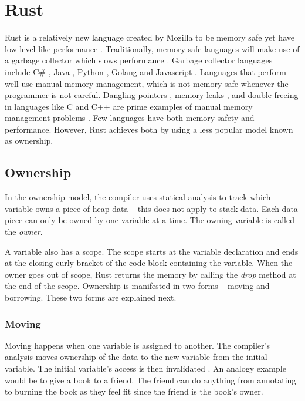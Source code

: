\section{Rust}
Rust is a relatively new language created by Mozilla to be memory safe yet have low level like performance \cite{klabnik_2019_01}.
Traditionally, memory safe languages will make use of a garbage collector which slows performance \cite{hertz_05_01}.
Garbage collector languages include C\# \cite{robinson_04_01}, Java \cite{gosling_96_01}, Python \cite{martelli_06_01}, Golang \cite{tsoukalos_18_01} and Javascript \cite{flanagan_06_01}.
Languages that perform well use manual memory management, which is not memory safe whenever the programmer is not careful.
Dangling pointers \cite{caballero_12_01}, memory leaks \cite{wilson_92_01}, and double freeing \cite{sharp_13_01} in languages like C and C++ are prime examples of manual memory management problems \cite{konrad_18_01}.
Few languages have both memory safety and performance.
However, Rust achieves both by using a less popular model known as ownership.

\subsection{Ownership}
In the ownership model, the compiler uses statical analysis \cite{rasmussen_2019_01} to track which variable owns a piece of heap data -- this does not apply to stack data.
Each data piece can only be owned by one variable at a time.
The owning variable is called the \textit{owner}.
\cite{klabnik_2019_01}

A variable also has a scope.
The scope starts at the variable declaration and ends at the closing curly bracket of the code block containing the variable.
When the owner goes out of scope, Rust returns the memory by calling the \textit{drop} method at the end of the scope.
Ownership is manifested in two forms -- moving and borrowing.
These two forms are explained next.
\cite{klabnik_2019_01}

\subsubsection{Moving}
Moving happens when one variable is assigned to another.
The compiler's analysis moves ownership of the data to the new variable from the initial variable.
The initial variable's access is then invalidated \cite{klabnik_2019_01}.
An analogy example would be to give a book to a friend.
The friend can do anything from annotating to burning the book as they feel fit since the friend is the book's owner.

